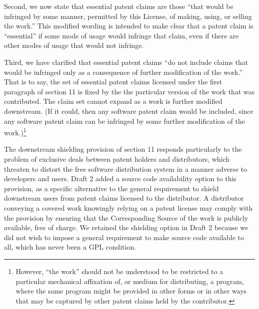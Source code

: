 Second, we now state that essential patent claims are those ``that would
be infringed by some manner, permitted by this License, of making,
using, or selling the work.'' This modified wording is intended to make
clear that a patent claim is ``essential'' if some mode of usage would
infringe that claim, even if there are other modes of usage that would
not infringe.

Third, we have clarified that essential patent claims ``do not include
claims that would be infringed only as a consequence of further
modification of the work.''  That is to say, the set of essential patent
claims licensed under the first paragraph of section 11 is fixed by the
the particular version of the work that was contributed.  The claim set
cannot expand as a work is further modified downstream.  (If it could,
then any software patent claim would be included, since any software
patent claim can be infringed by some further modification of the
work.)\footnote{However, ``the work'' should not be understood to be
restricted to a particular mechanical affixation of, or medium for
distributing, a program, where the same program might be provided in
other forms or in other ways that may be captured by other patent claims
held by the contributor.}


The downstream shielding provision of section 11 responds particularly
to the problem of exclusive deals between patent holders and
distributors, which threaten to distort the free software distribution
system in a manner adverse to developers and users. Draft 2 added a
source code availability option to this provision, as a specific
alternative to the general requirement to shield downstream users from
patent claims licensed to the distributor. A distributor conveying a
covered work knowingly relying on a patent license may comply with the
provision by ensuring that the Corresponding Source of the work is
publicly available, free of charge.  We retained the shielding option in
Draft 2 because we did not wish to impose a general requirement to make
source code available to all, which has never been a GPL condition.

